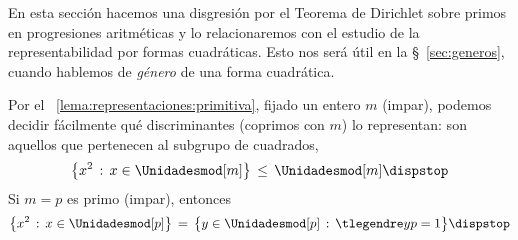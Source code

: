 \theoremstyle{plain}
\newtheorem{teoDirichlet}{\teoname}[section]

\theoremstyle{definition}


En esta secci\'on hacemos una disgresi\'on por el
Teorema de Dirichlet sobre primos en progresiones aritm\'eticas y
lo relacionaremos con el estudio de la representabilidad por formas
cuadr\'aticas. Esto nos ser\'a \'util en la \S~\ref{sec:generos},
cuando hablemos de \emph{g\'enero} de una forma cuadr\'atica.

Por el \lemaname~\ref{lema:representaciones:primitiva}, fijado un entero
$m$ (impar), podemos decidir f\'acilmente qu\'e discriminantes (coprimos
con $m$) lo representan:
son aquellos que pertenecen al subgrupo de cuadrados,
\begin{displaymath}
	\big\{ x^2\,:\,x\in\Unidadesmod[m] \big\}\,\leq\,\Unidadesmod[m]
	\dispstop
\end{displaymath}
%
Si $m=p$ es primo (impar), entonces
\begin{displaymath}
	\big\{ x^2\,:\,x\in\Unidadesmod[p] \big\}\,=\,
		\big\{ y\in\Unidadesmod[p]\,:\,\tlegendre y p=1\big\}
	\dispstop
\end{displaymath}
%

